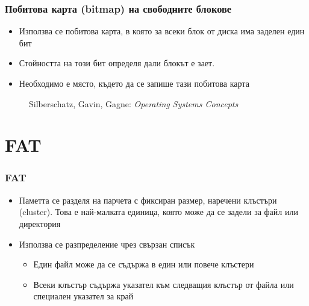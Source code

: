 \documentclass[ignorenonframetext, hyperref=unicode]{beamer}
\begin{document}
\begin{frame}
\frametitle{Побитова карта (bitmap) на свободните блокове}
\begin{itemize}
  \item Използва се побитова карта, в която за всеки блок от диска има заделен един бит
  \item Стойността на този бит определя дали блокът е зает.
  \item Необходимо е място, където да се запише тази побитова карта
\end{itemize}
\begin{figure}[h]
\center
{}
\caption{Silberschatz, Gavin, Gagne: {\em Operating Systems Concepts}}
\end{figure}
\end{frame}


\section{FAT}


\begin{frame}
\frametitle{FAT}
\begin{itemize}
  \item Паметта се разделя на парчета с фиксиран размер, наречени клъстъри (cluster). Това е най-малката единица, която може да се задели за файл или директория
  \item Използва се разпределение чрез свързан списък
  \begin{itemize}
    \item Един файл може да се съдържа в един или повече клъстери
    \item Всеки клъстър съдържа указател към следващия клъстър от файла или специален указател за край
  \end{itemize}
\end{itemize}
\end{frame}
\end{document}
